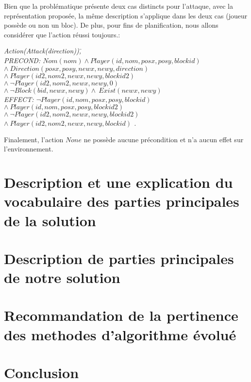 \documentclass[12pt,english,frenchb,letterpaper]{article}
\begin{document}
Bien que la problématique présente deux cas distincts pour l'attaque, avec la représentation proposée, la même description s'applique dans les deux cas (joueur possède ou non un bloc).  De plus, pour fins de planification, nous allons considérer que l'action réussi toujours.:

\begin{tabbing}
\it{Action}\=\it{(Attack(direction))}\=,\\
\> PRECOND: \> $Nom(nom) \wedge Player(id,nom,posx,posy,blockid)$ \\ 
\> \> $  \wedge \ Direction(posx,posy,newx,newy,direction) $ \\
\> \> $  \wedge \ Player(id2,nom2,newx,newy,blockid2) $ \\
\> \> $  \wedge \ \lnot Player(id2,nom2,newx,newy,0) $ \\
\> \> $ \wedge\ \lnot Block(bid,newx,newy) \wedge \ Exist(newx,newy)$ \\               
\> EFFECT: \>$ \lnot Player(id,nom,posx,posy,blockid) $ \\
\>  \> $\wedge\ Player(id,nom,posx,posy,blockid2)$ \\
\>  \> $\wedge\ \lnot Player(id2,nom2,newx,newy,blockid2)$ \\
\>  \> $\wedge\ Player(id2,nom2,newx,newy,blockid)$ .\\
\end{tabbing}

Finalement, l'action $None$ ne possède aucune précondition et n'a aucun effet sur l'environnement.

\section{Description et une explication du vocabulaire des parties principales de la solution}

\section{Description de parties principales de notre solution}

\section{Recommandation de la pertinence des methodes d'algorithme évolué}

\section{Conclusion}
\end{document}
